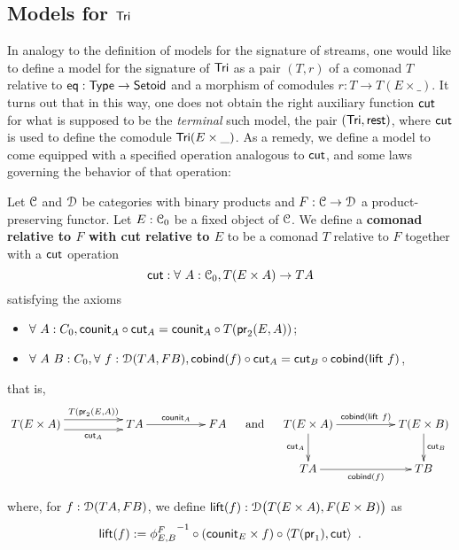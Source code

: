 \documentclass[a4paper,USenglish]{lipics}
\newcommand{\fat}[1]{\textbf{#1}}
\begin{document}
\subsection{Models for $\Tri$}

In analogy to the definition of models for the signature of streams, one would like to define
a model for the signature of $\Tri$ as a pair $(T,r)$ of a comonad $T$ relative to $\eq : \Set \to \Setoid$ and 
a morphism of comodules $r : T \to T(E\times \_)$. 
It turns out that in this way, one does not obtain the right auxiliary function $\cut$ for what is
supposed to be the \emph{terminal} such model, the pair $(\Tri,\tail)$, where $\cut$ is used to define the comodule $\Tri(E\times \_)$.
As a remedy, we define a model to come equipped with a specified operation analogous to $\cut$, and some laws governing
the behavior of that operation:




\begin{defn}%
\label{def:rel_comonad_with_cut}
 Let $\C$ and $\D$ be categories with binary products and $F:\C\to\D$ a product-preserving functor. Let $E:\C_0$ be a fixed object of $\C$.
 We define a \fat{comonad relative to $F$ with cut relative to $E$} to be a comonad $T$ relative to $F$ together with a $\cut$ operation 
    \[ \cut : \forall~A:\C_0, T(E\times A) \to TA \]
%   
 satisfying the axioms
  \begin{itemize}
   \item $\forall~A:C_0, \comp{\cut_A}{\counit_A} = \comp{T(\pr_2(E,A))}{\counit_{A}}$;
   \item $\forall~A~B:C_0,\forall~f:\D(TA,FB), \comp{\cut_A}{\cobind(f)} = \comp{\cobind(\extend~f)}{\cut_B}$,
  \end{itemize}
that is,
\[
 \begin{xy}
  \xymatrix@C=5em{
                T(E\times A) \ar@<1ex>[r]^-{T(\pr_2(E,A))} \ar@<-1ex>[r]_-{\cut_A} & TA \ar[r]^{\counit_A} & FA
  }
 \end{xy}
 \quad\text{ and } \quad
 \begin{xy}
  \xymatrix@C=5em{
	      T(E\times A) \ar[r]^{\cobind(\extend~f)} \ar[d]_{\cut_A} & T(E\times B) \ar[d]^{\cut_B} \\
	      TA \ar[r]_{\cobind(f)} &  TB 
  }
 \end{xy}
\]


  \noindent
  where, for $f:\D(TA,FB)$, we define $\extend(f) : \D\bigl(T(E\times A),F(E\times B)\bigr)$ as
       \[ \extend(f) := \comp{\comp{\langle T(\pr_1) , \cut \rangle}{(\counit_E\times f)}}{{\phi^{F}_{E,B}}^{-1}} \enspace . \]
  
\end{defn}
\end{document}
